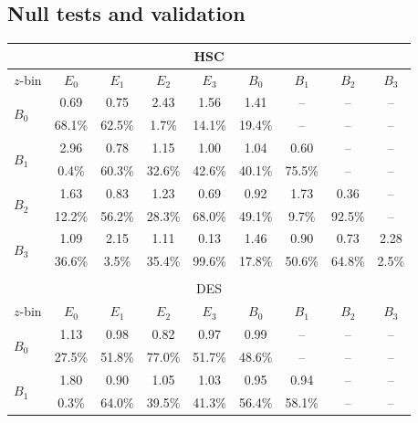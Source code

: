 \documentclass[a4paper,11pt]{article}
\newcommand{\zbin}{$z$-bin\xspace}
\begin{document}
    \subsection{Null tests and validation}\label{ssec:results.val}
      \begin{table}
      \centering
      \begin{tabular}{|l|cccccccc|}
        \multicolumn{9}{c}{HSC}\\
        \hline
        \zbin & $E_0$ & $E_1$ & $E_2$ & $E_3$ & $B_0$ & $B_1$ & $B_2$ & $B_3$\\
        \hline
        \multirow{2}{*}{$B_0$} & 0.69   & 0.75   & 2.43   & 1.56   & 1.41   & -- & -- & -- \\
                               & 68.1\% & 62.5\% & 1.7\% & 14.1\% & 19.4\% & -- & -- & -- \\
        \hline
        \multirow{2}{*}{$B_1$} & 2.96   & 0.78   & 1.15   & 1.00   & 1.04   & 0.60   & -- & -- \\
                               & 0.4\%  & 60.3\% & 32.6\% & 42.6\%  & 40.1\% & 75.5\% & -- & -- \\
        \hline
        \multirow{2}{*}{$B_2$} & 1.63   & 0.83   & 1.23   & 0.69   & 0.92   & 1.73   & 0.36   & -- \\
                               & 12.2\% & 56.2\% & 28.3\% & 68.0\% & 49.1\% & 9.7\% & 92.5\% & -- \\
        \hline
        \multirow{2}{*}{$B_3$} & 1.09   & 2.15   & 1.11   & 0.13   & 1.46   & 0.90  & 0.73   & 2.28   \\
                               & 36.6\% & 3.5\% & 35.4\% & 99.6\% & 17.8\% & 50.6\% & 64.8\% & 2.5\% \\
        \hline
        \multicolumn{9}{c}{}\\
        \multicolumn{9}{c}{DES}\\
        \hline
        \zbin & $E_0$ & $E_1$ & $E_2$ & $E_3$ & $B_0$ & $B_1$ & $B_2$ & $B_3$\\
        \hline
        \multirow{2}{*}{$B_0$} & 1.13   & 0.98   & 0.82   & 0.97   & 0.99   & -- & -- & -- \\
                               & 27.5\% & 51.8\% & 77.0\% & 51.7\% & 48.6\% & -- & -- & -- \\
        \hline
        \multirow{2}{*}{$B_1$} & 1.80   & 0.90   & 1.05   & 1.03   & 0.95   & 0.94   & -- & -- \\
                               & 0.3\%  & 64.0\% & 39.5\% & 41.3\%   & 56.4\% & 58.1\% & -- & -- \\

\end{tabular}
\end{table}
\end{document}
